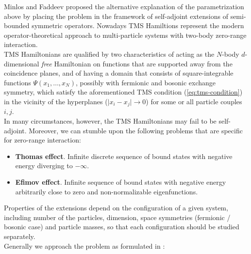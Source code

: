 \documentclass[11pt, a4paper, german]{article}
\theoremstyle{plain}
\theoremstyle{definition}
\theoremstyle{remark}
\numberwithin{equation}{section}
\numberwithin{theorem}{section}
\begin{document}
Minlos and Faddeev proposed the alternative explanation of the parametrization above by placing the problem in the framework of self-adjoint extensions of semi-bounded symmetric operators. Nowadays TMS Hamiltions represent the modern operator-theoretical approach to multi-particle systems with two-body zero-range interaction.\\

TMS Hamiltonians are qualified by two characteristics of acting as the $N$-body $d$-dimensional \textit{free} Hamiltonian on functions that are supported away from the coincidence planes, and of having a domain that consists of square-integrable functions $\Psi(x_1, \dots, x_N)$, possibly with fermionic and bosonic exchange symmetry, which satisfy the aforementioned TMS condition (\ref{eq:tms-condition}) in the vicinity of the hyperplanes ($\vert x_i - x_j\vert \rightarrow 0$) for some or all particle couples $i, j$.\\

In many circumstances, however, the TMS Hamiltonians may fail to be self-adjoint. Moreover, we can stumble upon the following problems that are specific for zero-range interaction:

\begin{itemize}
\item \textbf{Thomas effect}. Infinite discrete sequence of bound states with negative energy diverging to $-\infty$.
\item \textbf{Efimov effect}. Infinite sequence of bound states with negative energy arbitrarily close to zero and non-normalizable eigenfunctions.
\end{itemize}

Properties of the extensions depend on the configuration of a given system, including number of the particles, dimension, space symmetries (fermionic / bosonic case) and particle masses, so that each configuration should be studied separately.\\

Generally we approach the problem as formulated in \cite{A2}:
\end{document}
